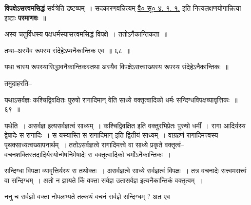 \documentclass[article,12pt,a4paper]{memoir}
\begin{document}
	  \pstart \textbf{विपक्षेऽसत्त्वमसिद्धं} सर्वत्रेति द्रष्टव्यम् । \leavevmode{} सदकारणवन्नित्यम् \href{http://sarit.indology.info/?cref=vsū.4.1.1}{वै० सू० ४.
	१. १.} इति नित्यलक्षणयोगान्नित्या इष्टाः \textbf{परमाणवः} ॥
	\pend
	  \bigskip
	  \begingroup
	

	  \pstart अस्य चतुर्विधस्य पक्षधर्मस्यासत्त्वमसिद्धं विपक्षे । ततोऽनैकान्तिकता ॥
	\pend
        
	  \bigskip
	  \begingroup
	

	  \pstart तथा--अस्यैव रूपस्य संदेहेऽप्यनैकान्तिक एव ॥ ६८ ॥
	\pend
      
	  \endgroup
	 

	  \pstart यथा चास्य रूपस्यासिद्धावनैकान्तिकस्तथा अस्यैव विपक्षेऽसत्त्वाख्यस्य रूपस्य संदेहेऽनैकान्तिकः ॥
	\pend
        

	  \pstart तमुदाहरति--
	\pend
        
	  \bigskip
	  \begingroup
	

	  \pstart यथाऽसर्वज्ञः कश्चिद्विवक्षितः पुरुषो रागादिमान् वेति साध्ये वक्तृत्वादिको धर्मः सन्दिग्धविपक्षव्यावृत्तिकः ॥ ६९ ॥
	\pend
      
	  \endgroup
	 

	  \pstart यथेति । असर्वज्ञ इत्यसर्वज्ञत्वं साध्यम् । कश्चिद्विवक्षित इति वक्तुरभिप्रेतः पुरुषो धर्मीं । रागा आदिर्यस्य द्वेषादेः स रागादिः । स यस्यास्ति स रागादिमान् इति द्वितीयं साध्यम् । वाग्रहणं रागादिमत्त्वस्य पृथक्साध्यत्वख्यापनार्थम् । ततोऽसर्वज्ञत्वे रागादिमत्त्वे वा साध्ये प्रकृते वक्तृत्वं--वचनशक्तिस्तदादिर्यस्योन्मेषनिमेषादेः स वक्तृत्वादिको धर्मोऽनैकान्तिकः ।
	\pend
        

	  \pstart सन्दिग्धा विपक्षा व्यावृत्तिर्यस्य स तथोक्तः । असर्वज्ञत्वे साध्ये सर्वज्ञत्वं विपक्षः । तत्र वचनादेः सत्त्वमसत्त्वं वा सन्दिग्धम् । अतो न ज्ञायते किं वक्ता सर्वज्ञ उतासर्वज्ञ इत्यनैकान्तिकं वक्तृत्वम् ।
	\pend
        

	  \pstart ननु च सर्वज्ञो वक्ता नोपलभ्यते तत्कथं वचनं सर्वज्ञे सन्दिग्धम् ? अत एव
	\pend
        
	  \bigskip
	  \begingroup
	
\end{document}
